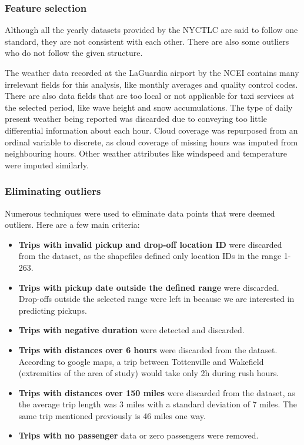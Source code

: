 \documentclass[11pt]{article}
\begin{document}
\subsubsection{Feature selection}

Although all the yearly datasets provided by the NYCTLC are said to follow one standard, they are not consistent with each other. There are also some outliers who do not follow the given structure. 

The weather data recorded at the LaGuardia airport by the NCEI \cite{weatherDataGuide} contains many irrelevant fields for this analysis, like monthly averages and quality control codes. There are also data fields that are too local or not applicable for taxi services at the selected period, like wave height and snow accumulations. The type of daily present weather being reported was discarded due to conveying too little differential information about each hour. Cloud coverage was repurposed from an ordinal variable to discrete, as cloud coverage of missing hours was imputed from neighbouring hours. Other weather attributes like windspeed and temperature were imputed similarly.

\subsubsection{Eliminating outliers}

Numerous techniques were used to eliminate data points that were deemed outliers. Here are a few main criteria:

\begin{itemize}
    \item \textbf{Trips with invalid pickup and drop-off location ID} were discarded from the dataset, as the shapefiles defined only location IDs in the range 1-263.
    \item \textbf{Trips with pickup date outside the defined range} were discarded. Drop-offs outside the selected range were left in because we are interested in predicting pickups.
    \item \textbf{Trips with negative duration} were detected and discarded.
    \item \textbf{Trips with distances over 6 hours} were discarded from the dataset. According to google maps, a trip between Tottenville and Wakefield (extremities of the area of study) would take only 2h during rush hours.
    \item \textbf{Trips with distances over 150 miles} were discarded from the dataset, as the average trip length was 3 miles with a standard deviation of 7 miles. The same trip mentioned previously is 46 miles one way.
    \item \textbf{Trips with no passenger} data or zero passengers were removed.
\end{itemize}
\end{document}
